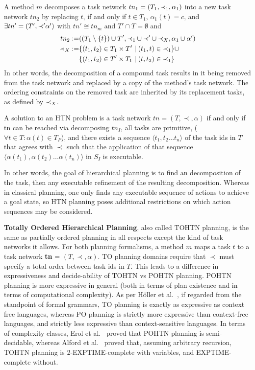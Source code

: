 \documentclass[runningheads]{llncs}
\begin{document}
A method $m$ decomposes a task network $tn_1 = (T_1, \mathit{ \mathord{\prec} }_1, \alpha_1)$ into
a new task network $tn_2$ by replacing $t$, if and only if $t \in T_1$, $\alpha_1(t) = c$, and $\exists tn' = (T', \mathit{ \mathord{\prec} }' \alpha')$ with $tn' \cong tn_m$ and $T' \cap T = \emptyset$ and
\begin{align}
tn_2 :=     &((T_1 \setminus \{t\}) \cup T',    \mathit{ \mathord{\prec} }_1 \cup \mathit{ \mathord{\prec} }' \cup \mathit{ \mathord{\prec} }_X,        \alpha_1 \cup \alpha') \\
\mathit{ \mathord{\prec} }_X :=  &\{(t_1, t_2) \in T_1 \times T'  \mid  (t_1,t) \in \mathit{ \mathord{\prec} }_1 \} \cup \\
&\{(t_1, t_2) \in T' \times T_1 \mid (t, t_2) \in \mathit{ \mathord{\prec} }_1 \}  
\end{align}
In other words, the decomposition of a compound task results in it being removed from the task network and replaced by a copy of the method’s task network. The ordering constraints
on the removed task are inherited by its replacement tasks, as defined by $\mathit{ \mathord{\prec} }_X$. 

A solution to an HTN problem is a task network $tn = (T, \prec, \alpha)$ if and only if
tn can be reached via decomposing $tn_I$, all tasks are primitive, ($\forall t \in T: \alpha(t) \in T_P$), and there exists a sequence $\langle t_1, t_2 ... t_n \rangle$ of the task ids in $T$ that agrees with $\prec$ such that the application of that sequence $\langle \alpha(t_1), \alpha(t_2) ... \alpha(t_n) \rangle$ in $S_I$ is executable.
     
In other words, the goal of hierarchical planning is to find an decomposition of the task, then any executable refinement of the resulting decomposition. Whereas in classical planning, one only finds any executable sequence of actions to achieve a goal state, so HTN planning poses additional restrictions on which action sequences may be considered.

\textbf{Totally Ordered Hierarchical Planning}, also called TOHTN planning, is the same as partially ordered planning in all respects except the kind of task networks it allows.
For both planning formalisms, a method $m$ maps a task $t$ to a task network \textbf{tn} = $(T, \prec, \alpha)$. TO planning domains require that $\prec$ must specify a total order between task ids in $T$.
This leads to a difference in expressiveness and decide-ability of TOHTN vs POHTN planning. POHTN planning is more expressive in general (both in terms of plan existence and in terms of computational complexity). As per H\"{o}ller et al.\ \cite{LanguageClassificationPlanning}, if regarded from the standpoint of formal grammars, TO planning is exactly as expressive as context free languages, whereas PO planning is strictly more expressive than context-free languages, and strictly less expressive than context-sensitive languages.
In terms of complexity classes, Erol et al.\ \cite{ErolHTNExpressivity} proved that POHTN planning is semi-decidable, whereas
Alford et al.\ \cite{Alford2015TightHTNBounds} proved that, assuming arbitrary recursion, TOHTN planning is 2-EXPTIME-complete with variables, and EXPTIME-complete without. 
\end{document}
